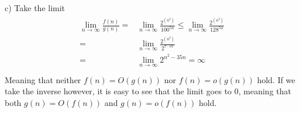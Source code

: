 \documentclass[a4paper, 10pt]{article}
\begin{document}
c) Take the limit 
\begin{gather*}
\begin{aligned}
\lim_{n\to\infty}\frac{f(n)}{g(n)}=&\lim_{n\to\infty}\frac{2^{(n^2)}}{100^{5n}}\leq\lim_{n\to\infty}\frac{2^{(n^2)}}{128^{5n}}\\
=&\lim_{n\to\infty}\frac{2^{(n^2)}}{2^{7\cdot5n}}\\
=&\lim_{n\to\infty}2^{n^2-35n}=\infty\\
\end{aligned}
\end{gather*}
Meaning that neither $f(n)=O(g(n))$ nor $f(n)=o(g(n))$ hold. If we take the inverse however, it is easy to see that the limit goes to 0, meaning that both $g(n)=O(f(n))$ and $g(n)=o(f(n))$ hold.
\end{document}
